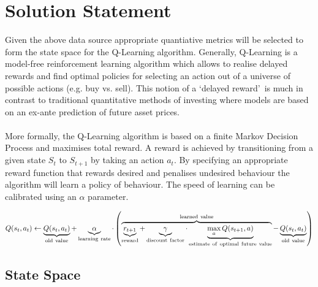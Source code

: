 \documentclass[dvips,12pt]{article}
\begin{document}
\section{Solution Statement}
Given the above data source appropriate quantiative metrics will be selected to form the state space for the Q-Learning algorithm\cite{sutton1998}. Generally, Q-Learning is a model-free reinforcement learning algorithm which allows to realise delayed rewards and find optimal policies for selecting an action out of a universe of possible actions (e.g. buy vs. sell). This notion of a \lq delayed reward\rq ~is much in contrast to traditional quantitative methods of investing where models are based on an ex-ante prediction of future asset prices.
\\\\
More formally, the Q-Learning algorithm is based on a finite Markov Decision Process and maximises total reward. A reward is achieved by transitioning from a given state $S_t$ to $S_{t+1}$ by taking an action $a_t$. By specifying an appropriate reward function that rewards desired and penalises undesired behaviour the algorithm will learn a policy of behaviour. The speed of learning can be calibrated using an $\alpha$ parameter.

\begin{equation}
	Q(s_{t},a_{t}) \leftarrow \underbrace{Q(s_{t},a_{t})}_{\rm old~value} + \underbrace{\alpha}_{\rm learning~rate} \cdot \left( \overbrace{\underbrace{r_{t+1}}_{\rm reward} + \underbrace{\gamma}_{\rm discount~factor} \cdot \underbrace{\max_{a}Q(s_{t+1}, a)}_{\rm estimate~of~optimal~future~value}}^{\rm learned~value} - \underbrace{Q(s_{t},a_{t})}_{\rm old~value} \right)
\end{equation}

\subsection*{State Space}
\end{document}
